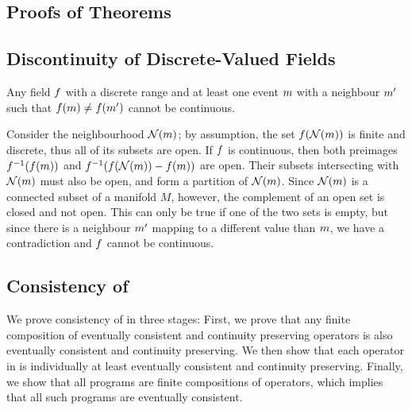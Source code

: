 \documentclass[12pt,a4paper,twoside,openright]{book}
\begin{document}
\small\protect\newpage{}



\listoffigures
\listoftables

\begin{appendices}
\chapter{Proofs of Theorems}
\label{proofs}

\section{Discontinuity of Discrete-Valued Fields}

\begin{thm}
  Any field $f$ with a discrete range and at least one event $m$ with a neighbour $m'$ such that $f(m) \neq
  f(m')$ cannot be continuous.
\end{thm}
 Consider the neighbourhood $\mathcal{N}(m)$; by assumption, the set $f(\mathcal{N}(m))$ is finite and discrete, thus all of its subsets are open. 
 If $f$ is continuous, then both preimages $f^{-1}(f(m))$ and $f^{-1}(f(\mathcal{N}(m)) - f(m))$ are open.
 Their subsets intersecting with $\mathcal{N}(m)$ must also be open, and form a partition of $\mathcal{N}(m)$.  Since $\mathcal{N}(m)$ is a connected subset of a manifold $M$, however, the complement of an open set is closed and not open.
 This can only be true if one of the two sets is empty, but since there is a neighbour $m'$ mapping to a different value than $m$, we have a contradiction and $f$ cannot be continuous.


\section{Consistency of \calculus{}}
\label{app:consistency}

We prove consistency of \calculus{} in three stages: 
%
First, we prove that any finite composition of eventually consistent and continuity preserving operators is also eventually consistent and continuity preserving.
%
We then show that each operator in \calculus{} is individually at least eventually consistent and continuity preserving.  
%
Finally, we show that all \calculus{} programs are finite compositions of operators, which implies that all such programs are eventually consistent.


\end{appendices}
\end{document}
